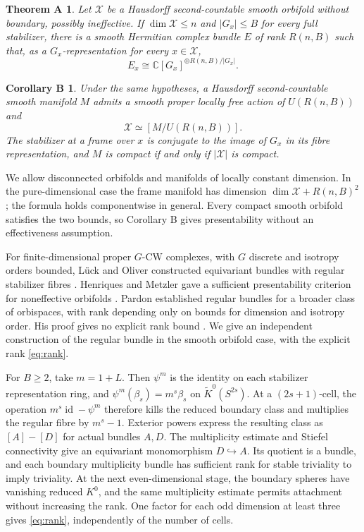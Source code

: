 \documentclass[11pt,a4paper,reqno]{amsart}
\numberwithin{equation}{section}
\theoremstyle{remark}
\theoremstyle{plain}
\newtheorem*{maintheorem}{Theorem A}
\newtheorem*{maincorollary}{Corollary B}
\newcommand{\X}{\mathcal X}
\newcommand{\C}{\mathbb C}
\newcommand{\id}{\operatorname{id}}
\begin{document}
\begin{samepage}
\begin{maintheorem}
Let $\X$ be a Hausdorff second-countable smooth orbifold without boundary,
possibly ineffective. If $\dim\X\leq n$ and $|G_x|\leq B$ for every full
stabilizer, there is a smooth Hermitian complex bundle $E$ of rank $R(n,B)$
such that, as a $G_x$-representation for every $x\in\X$,
\[
 E_x\cong\C[G_x]^{\oplus R(n,B)/|G_x|}.
\]
\end{maintheorem}
\end{samepage}

\begin{maincorollary}
Under the same hypotheses, a Hausdorff second-countable smooth manifold $M$
admits a smooth proper locally free action of $U(R(n,B))$ and
\[
 \X\simeq[M/U(R(n,B))].
\]
The stabilizer at a frame over $x$ is conjugate to the image of $G_x$ in its
fibre representation, and $M$ is compact if and only if $|\X|$ is compact.
\end{maincorollary}

We allow disconnected orbifolds and manifolds of locally constant dimension.
In the pure-dimensional case the frame manifold has dimension
$\dim\X+R(n,B)^2$; the formula holds componentwise in general.
Every compact smooth orbifold satisfies the two bounds, so
Corollary B gives presentability without an effectiveness assumption.

For finite-dimensional proper $G$-CW complexes, with $G$ discrete and
isotropy orders bounded, L\"uck and Oliver constructed equivariant bundles
with regular stabilizer fibres
\cite[Corollary 2.7]{LO}. Henriques and Metzler gave a sufficient
presentability criterion for noneffective orbifolds \cite{HM}.
Pardon established regular bundles for a broader class of orbispaces,
with rank depending only on bounds for dimension and isotropy order.
His proof gives no explicit rank bound
\cite[Theorem~1.1 and p.~2047]{Pardon}. We give an independent construction
of the regular bundle in the smooth orbifold case, with the explicit rank
\eqref{eq:rank}.

For $B\geq2$, take $m=1+L$. Then $\psi^m$ is the identity on each
stabilizer representation ring, and
$\psi^m(\beta_s)=m^s\beta_s$ on $\widetilde K^0(S^{2s})$.
At a $(2s+1)$-cell, the operation $m^s\id-\psi^m$ therefore kills the
reduced boundary class and multiplies the regular fibre by $m^s-1$.
Exterior powers express the resulting class as $[A]-[D]$ for actual
bundles $A,D$. The multiplicity estimate and Stiefel connectivity give an
equivariant monomorphism $D\hookrightarrow A$. Its quotient is a bundle,
and each boundary multiplicity bundle has sufficient rank for stable
triviality to imply triviality.
At the next even-dimensional stage, the boundary spheres have vanishing
reduced $K^0$, and the same multiplicity estimate permits attachment
without increasing the rank. One factor for each odd dimension at least
three gives \eqref{eq:rank}, independently of the number of cells.
\end{document}
